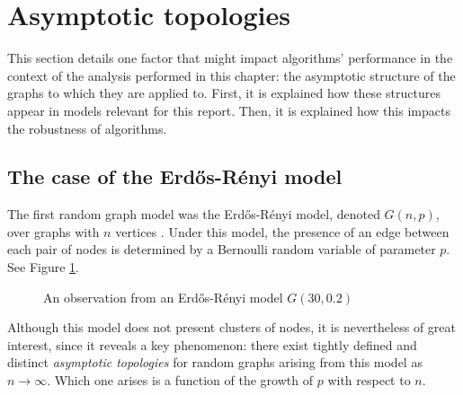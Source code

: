 \documentclass[../../main.tex]{subfiles} %
\begin{document}
\section{Asymptotic topologies}  %
\label{sec:asymptotic-topologies}
This section details one factor that might impact algorithms' performance in the 
context of the analysis performed in this chapter: the asymptotic structure of 
the graphs to which they are applied to. First, it is explained how these 
structures appear in models relevant for this report. Then, it is explained how 
this impacts the robustness of algorithms.

\subsection{The case of the Erd\H{o}s-Rényi model}
The first random graph model was the Erd\H{o}s-Rényi model, denoted \(G(n, 
p)\), over graphs with \(n\) vertices \cite{erdos59a}. Under this model, the 
presence of an edge between each pair of nodes is determined by a Bernoulli 
random variable of parameter \(p\). See Figure \ref{fig:obs-erdos-renyi}. 
\begin{figure}[h]
	\centering
	\caption{An observation from an Erd\H{o}s-Rényi model \(G(30, 0.2)\)}
	\label{fig:obs-erdos-renyi}
\end{figure}

Although this model does not present clusters of nodes, it is nevertheless of 
great interest, since it reveals a key phenomenon: there exist tightly defined 
and distinct \textit{asymptotic topologies} for random graphs arising from this 
model as \(n \to \infty\). Which one arises is a function of the growth of 
\(p\) with respect to \(n\).

\begin{theorem}
	
	
	
\end{theorem}
\end{document}
